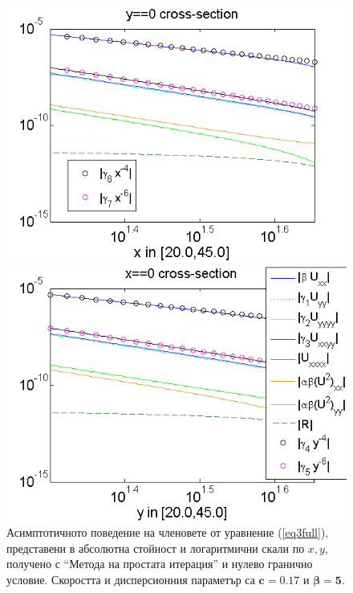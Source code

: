 \documentclass{article}
\newcommand{\rf}[1]{(\ref{#1})}
\begin{document}
\FloatBarrier
\begin{figure}[ht]
	\begin{minipage}[b]{0.95\linewidth}
		\raggedleft
		\includegraphics[width=\linewidth]{AssymptForEachTerm/c017_bt1_5/ChristovIC_AlongX_50_ZB2_bt5_c017_h020_O(h^6).png}
	\end{minipage}
	\begin{minipage}[b]{0.95\linewidth}
		 \raggedright
		\includegraphics[width=\linewidth]{AssymptForEachTerm/c017_bt1_5/ChristovIC_AlongY_50_ZB2_bt5_c017_h020_O(h^6).png}
	\end{minipage}
	\caption{Асимптотичното поведение на членовете от уравнение \rf{eq3full}, представени в абсолютна стойност и логаритмични скали по $x,y$, получено с ``Метода на простата итерация'' и нулево гранично условие. Скоростта и дисперсионния параметър са $\boldsymbol{c=0.17}$ и $\boldsymbol{\beta = 5}$.}
	\label{fig:assympt_c017bt5}
\end{figure}
\end{document}
